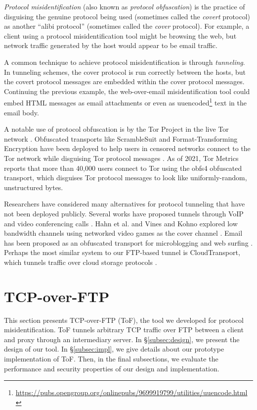 \documentclass[letterpaper,twocolumn,11pt]{article}
\begin{document}
\emph{Protocol misidentification} (also known as \emph{protocol obfuscation})
is the practice of disguising the genuine protocol being used (sometimes called
the \emph{covert} protocol) as another ``alibi protocol'' (sometimes called the
\emph{cover} protocol).  For example, a client using a protocol
misidentification tool might be browsing the web, but network traffic generated
by the host would appear to be email traffic.

A common technique to achieve protocol misidentification is through
\emph{tunneling}. In tunneling schemes, the cover protocol is run correctly
between the hosts, but the covert protocol messages are embedded within the
cover protocol messages. Continuing the previous example, the web-over-email
misidentification tool could embed HTML messages as email attachments or even
as
uuencoded\footnote{\url{https://pubs.opengroup.org/onlinepubs/9699919799/utilities/uuencode.html}}
text in the email body.

A notable use of protocol obfuscation is by the Tor Project in the live Tor
network \cite{tor}. Obfuscated transports like ScrambleSuit and Format-Transforming
Encryption have been deployed to help users in censored networks connect to the
Tor network while disguising Tor protocol messages \cite{scramblesuit, fte}.
As of 2021, Tor Metrics reports that more than 40,000 users connect to Tor
using the obfs4 obfuscated transport, which disguises Tor protocol messages to
look like uniformly-random, unstructured bytes.

Researchers have considered many alternatives for protocol tunneling that have
not been deployed publicly.  Several works have proposed tunnels through VoIP
and video conferencing calls \cite{skypemorph, facet, freewave, deltashaper}.
Hahn et al. and Vines and Kohno explored low bandwidth channels using networked
video games as the cover channel \cite{castle, rook}. Email has been proposed
as an obfuscated transport for microblogging and web surfing \cite{mailet,
sweet}. Perhaps the most similar system to our FTP-based tunnel is
CloudTransport, which tunnels traffic over cloud storage protocols
\cite{cloudtransport}.

\section{TCP-over-FTP} \label{sec:system}

This section presents TCP-over-FTP (ToF), the tool we developed for protocol
misidentification. ToF tunnels arbitrary TCP traffic over FTP between a client
and proxy through an intermediary server. In \S\ref{subsec:design}, we present
the design of our tool. In \S\ref{subsec:impl}, we give details about our
prototype implementation of ToF. Then, in the final subsections, we evaluate
the performance and security properties of our design and implementation.
\end{document}

